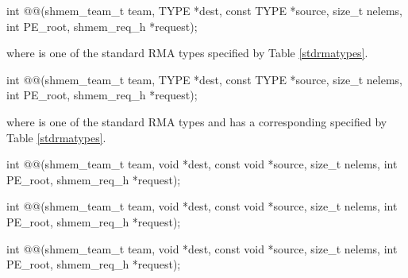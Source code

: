 
\begin{apidefinition}

\begin{C11synopsis}
int @@(shmem_team_t team, TYPE *dest, const TYPE
*source, size_t nelems, int PE_root,  shmem_req_h *request);
\end{C11synopsis}
where \TYPE{} is one of the standard \ac{RMA} types specified by Table \ref{stdrmatypes}.

\begin{Csynopsis}
\end{Csynopsis}
\begin{CsynopsisCol}
int @@(shmem_team_t team, TYPE
*dest, const TYPE *source, size_t nelems, int PE_root, shmem_req_h *request);
\end{CsynopsisCol}
where \TYPE{} is one of the standard \ac{RMA} types and has a corresponding \TYPENAME{} specified by Table \ref{stdrmatypes}.

\begin{CsynopsisCol}
int @@(shmem_team_t team, void *dest, const void
*source, size_t nelems, int PE_root, shmem_req_h *request);

int @@(shmem_team_t team, void *dest, const void
*source, size_t nelems, int PE_root, shmem_req_h *request);

int @@(shmem_team_t team, void *dest, const void
*source, size_t nelems, int PE_root, shmem_req_h *request);
\end{CsynopsisCol}

\begin{apiarguments}

%




\end{apiarguments}
\end{apidefinition}
